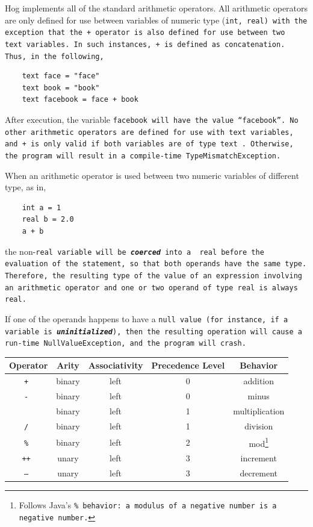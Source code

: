 \documentclass{article}
\begin{document}
Hog implements all of the standard arithmetic operators. All arithmetic operators are only defined for use between variables of
numeric type (\tt int\rm, \tt real\rm) with the exception that the \tt + \rm operator is also defined for use between two \tt
text \rm variables. In such instances, \tt + \rm is defined as concatenation. Thus, in the following,

\begin{verbatim}
    text face = "face"
    text book = "book"
    text facebook = face + book
\end{verbatim}

After execution, the variable \tt facebook \rm will have the value ``facebook''. No other arithmetic operators are defined for
use with \tt text \rm variables, and \tt + \rm is only valid if both variables are of type \tt text \rm. Otherwise, the program
will result in a compile-time \tt TypeMismatchException\rm. 

When an arithmetic operator is used between two numeric variables of different type, as in,

\begin{verbatim}
    int a = 1
    real b = 2.0
    a + b
\end{verbatim}

\noindent the non-\tt real \rm variable will be \textbf{\emph{coerced}} into a \tt
real \rm before the evaluation of the statement, so that both operands have the
same type. Therefore, the resulting type of the value of an expression involving
an arithmetic operator and one or two operand of type \tt real \rm is always \tt
real\rm.

If one of the operands happens to have a \tt null \rm value (for instance, if a variable is \textbf{\emph{uninitialized}}),
then the resulting operation will cause a run-time \tt NullValueException\rm, and the program will crash.

\begin{center}
\begin{tabular}{|c|c|c|c|c|}

\hline \textbf{Operator} & \textbf{Arity} & \textbf{Associativity} &
\textbf{Precedence Level} & \textbf{Behavior} \\ \hline
\tt + \rm & binary & left & 0 & addition \\ \hline
\tt - \rm & binary & left & 0 & minus \\ \hline
\tt * \rm & binary & left & 1 & multiplication \\ \hline
\tt / \rm & binary & left & 1 & division \\ \hline
\tt \% \rm & binary & left & 2 & mod\footnote{Follows Java's 
\tt \% \rm behavior: a modulus of a negative number is a negative number.} \\ 
\hline
\tt ++ \rm & unary & left & 3 & increment \\ \hline
\tt -- \rm & unary & left & 3 & decrement \\ \hline
\end{tabular}
\end{center}
\end{document}
